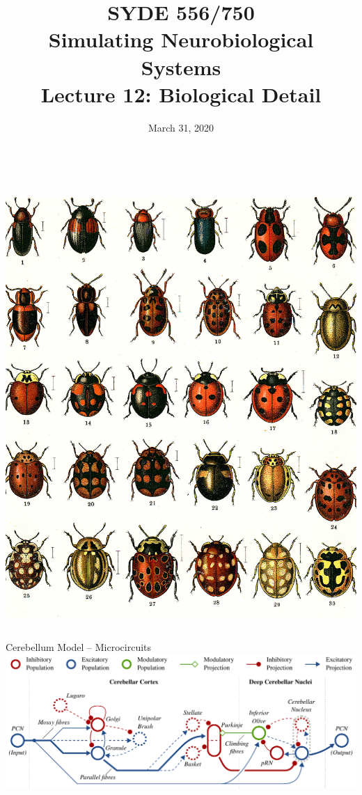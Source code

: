 \documentclass[handout,aspectratio=169]{beamer}
\date{March 31, 2020\\[-1cm]~~}
\title{SYDE 556/750 \\ Simulating Neurobiological Systems \\ Lecture 12: Biological Detail}
\begin{document}
	
	\begin{frame}{}
		\vspace{0.5cm}
		\begin{columns}[c]
			\MakeTitle
			\includegraphics[width=\textwidth]{media/beetles_small.jpg}
		\end{columns}
	\end{frame}

	\begin{frame}{Cerebellum Model -- Microcircuits}
		\centering
		\includegraphics[width=\textwidth]{media/cerebellum_anatomy.pdf}
	\end{frame}
\end{document}

